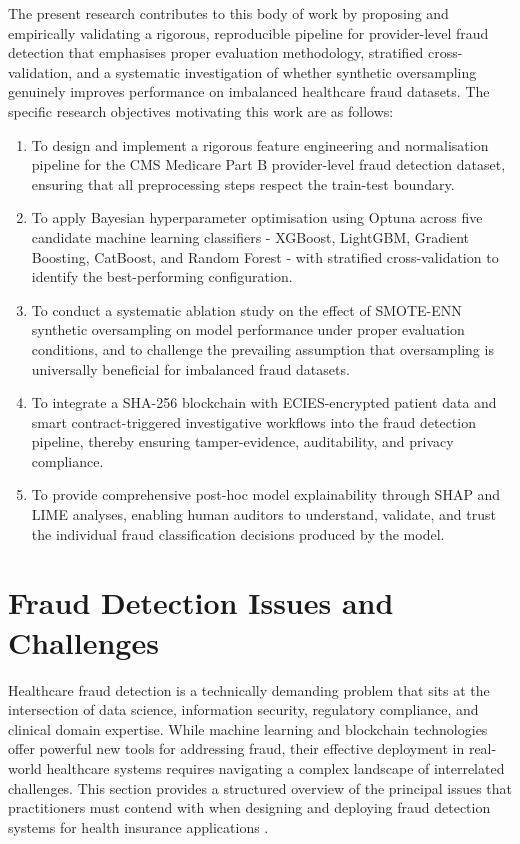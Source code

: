 The present research contributes to this body of work by proposing and empirically validating a rigorous, reproducible pipeline for provider-level fraud detection that emphasises proper evaluation methodology, stratified cross-validation, and a systematic investigation of whether synthetic oversampling genuinely improves performance on imbalanced healthcare fraud datasets. The specific research objectives motivating this work are as follows:

\begin{enumerate}[label=\roman*.]
    \item To design and implement a rigorous feature engineering and normalisation pipeline for the CMS Medicare Part B provider-level fraud detection dataset, ensuring that all preprocessing steps respect the train-test boundary.
    \item To apply Bayesian hyperparameter optimisation using Optuna across five candidate machine learning classifiers - XGBoost, LightGBM, Gradient Boosting, CatBoost, and Random Forest - with stratified cross-validation to identify the best-performing configuration.
    \item To conduct a systematic ablation study on the effect of SMOTE-ENN synthetic oversampling on model performance under proper evaluation conditions, and to challenge the prevailing assumption that oversampling is universally beneficial for imbalanced fraud datasets.
    \item To integrate a SHA-256 blockchain with ECIES-encrypted patient data and smart contract-triggered investigative workflows into the fraud detection pipeline, thereby ensuring tamper-evidence, auditability, and privacy compliance.
    \item To provide comprehensive post-hoc model explainability through SHAP and LIME analyses, enabling human auditors to understand, validate, and trust the individual fraud classification decisions produced by the model.
\end{enumerate}

\section{Fraud Detection Issues and Challenges}

Healthcare fraud detection is a technically demanding problem that sits at the intersection of data science, information security, regulatory compliance, and clinical domain expertise. While machine learning and blockchain technologies offer powerful new tools for addressing fraud, their effective deployment in real-world healthcare systems requires navigating a complex landscape of interrelated challenges. This section provides a structured overview of the principal issues that practitioners must contend with when designing and deploying fraud detection systems for health insurance applications \cite{cruz2017,liang2019}.

